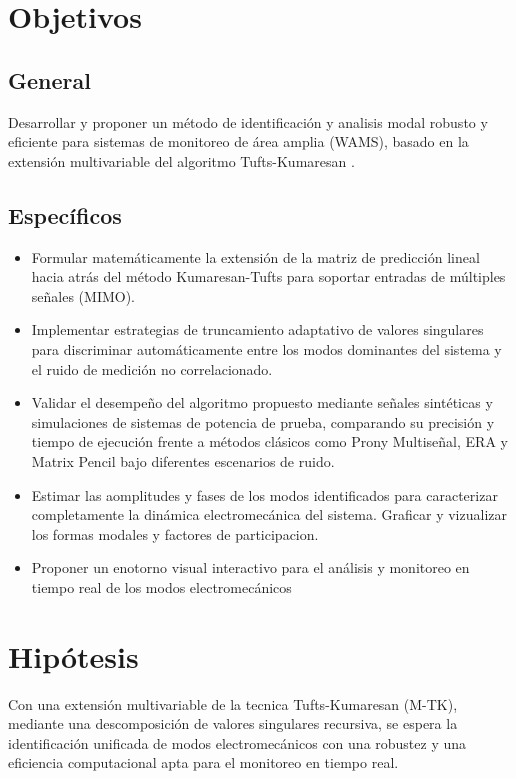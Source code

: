 \section{Objetivos}

\subsection{General}

Desarrollar y proponer un método de identificación y analisis modal robusto y eficiente para sistemas de monitoreo de área amplia (WAMS), basado en la extensión multivariable del algoritmo Tufts-Kumaresan \cite{Tufts1982} \cite{Moghdam2024}.

\subsection{Específicos}

\begin{itemize}
\item Formular matemáticamente la extensión de la matriz de predicción lineal hacia atrás del método Kumaresan-Tufts para soportar entradas de múltiples señales (MIMO).
\item Implementar estrategias de truncamiento adaptativo de valores singulares para discriminar automáticamente entre los modos dominantes del sistema y el ruido de medición no correlacionado.
\item Validar el desempeño del algoritmo propuesto mediante señales sintéticas y simulaciones de sistemas de potencia de prueba, comparando su precisión y tiempo de ejecución frente a métodos clásicos como Prony Multiseñal, ERA y Matrix Pencil bajo diferentes escenarios de ruido.
\item Estimar las aomplitudes y fases de los modos identificados para caracterizar completamente la dinámica electromecánica del sistema. Graficar y vizualizar los formas modales y factores de participacion.
\item Proponer un enotorno visual interactivo para el análisis y monitoreo en tiempo real de los modos electromecánicos
\end{itemize}

\section{Hipótesis}

Con una extensión multivariable de la tecnica Tufts-Kumaresan (M-TK), mediante una descomposición de valores singulares recursiva, se espera la identificación unificada de modos electromecánicos con una robustez y una eficiencia computacional apta para el monitoreo en tiempo real.

